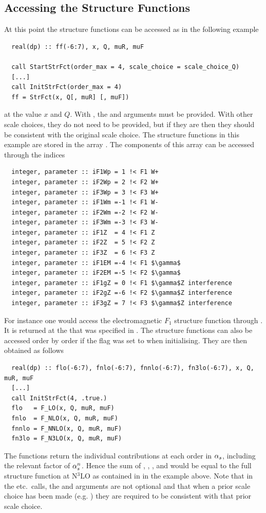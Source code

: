 \subsection{Accessing the Structure Functions}
\label{sec:structure-funcs-access}
At this point the structure functions can be accessed as in the following example
\begin{lstlisting}
  real(dp) :: ff(-6:7), x, Q, muR, muF
  
  call StartStrFct(order_max = 4, scale_choice = scale_choice_Q)
  [...]
  call InitStrFct(order_max = 4)
  ff = StrFct(x, Q[, muR] [, muF])
\end{lstlisting}
at the value $x$ and $Q$.
%
With , the  and 
arguments must be provided.
%
With other scale choices, they do not need to be provided, but if they
are then they should be consistent with the original scale choice.
%
The structure functions in this example are stored in the
array . The components of this array can be accessed through
the indices 
\begin{lstlisting}
  integer, parameter :: iF1Wp = 1 !< F1 W+
  integer, parameter :: iF2Wp = 2 !< F2 W+
  integer, parameter :: iF3Wp = 3 !< F3 W+
  integer, parameter :: iF1Wm =-1 !< F1 W-
  integer, parameter :: iF2Wm =-2 !< F2 W-
  integer, parameter :: iF3Wm =-3 !< F3 W-
  integer, parameter :: iF1Z  = 4 !< F1 Z 
  integer, parameter :: iF2Z  = 5 !< F2 Z
  integer, parameter :: iF3Z  = 6 !< F3 Z
  integer, parameter :: iF1EM =-4 !< F1 $\gamma$
  integer, parameter :: iF2EM =-5 !< F2 $\gamma$
  integer, parameter :: iF1gZ = 0 !< F1 $\gamma$Z interference
  integer, parameter :: iF2gZ =-6 !< F2 $\gamma$Z interference
  integer, parameter :: iF3gZ = 7 !< F3 $\gamma$Z interference
\end{lstlisting}
For instance one would access the electromagnetic $F_1$ structure
function through . It is returned at the 
that was specified in .
%
The structure functions can also be accessed order by order if the
 flag was set to  when initialising.
%
They are then obtained as follows
\begin{lstlisting}
  real(dp) :: flo(-6:7), fnlo(-6:7), fnnlo(-6:7), fn3lo(-6:7), x, Q, muR, muF
  [...]
  call InitStrFct(4, .true.)
  flo   = F_LO(x, Q, muR, muF)
  fnlo  = F_NLO(x, Q, muR, muF)
  fnnlo = F_NNLO(x, Q, muR, muF)
  fn3lo = F_N3LO(x, Q, muR, muF)
\end{lstlisting}
The functions return the individual contributions at each order in
$\alpha_s$, including the relevant factor of $\alpha_s^n$.
%
Hence the sum of , , , and
 would be equal to the full structure function at N$^3$LO as
contained in  in the example above.
%
Note that in the  etc.\ calls, the  and 
arguments are not optional and that when a prior scale choice has been
made (e.g. ) they are required to be consistent
with that prior scale choice.

